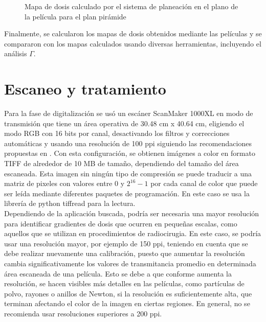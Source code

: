 \begin{figure}
	\centering
	
	\caption{Mapa de dosis calculado por el sistema de planeación en el plano de la película para el plan pirámide}
	\label{fig:TPSMama}
\end{figure}

Finalmente, se calcularon los mapas de dosis obtenidos mediante las películas y se compararon con los mapas calculados usando diversas herramientas, incluyendo el análisis $\Gamma$.

\section{Escaneo y tratamiento}
Para la fase de digitalización se usó un escáner ScanMaker 1000XL en modo de transmisión que tiene un área operativa de 30.48 cm x 40.64 cm, eligiendo el modo RGB con 16 bits por canal, desactivando los filtros y correcciones automáticas y usando una resolución de 100 ppi siguiendo las recomendaciones propuestas en \cite{Devic2016}. Con esta configuración, se obtienen imágenes a color en formato TIFF de alrededor de 10 MB de tamaño, dependiendo del tamaño del área escaneada. Esta imagen sin ningún tipo de compresión se puede traducir a una matriz de pixeles con valores entre $0$ y $2^{16}-1$ por cada canal de color que puede ser leída mediante diferentes paquetes de programación. En este caso se usa la librería de python tiffread para la lectura. \\

Dependiendo de la aplicación buscada, podría ser necesaria una mayor resolución para identificar gradientes de dosis que ocurren en pequeñas escalas, como aquellos que se utilizan en procedimientos de radiocirugia. En este caso, se podría usar una resolución mayor, por ejemplo de 150 ppi, teniendo en cuenta que se debe realizar nuevamente una calibración, puesto que aumentar la resolución cambia significativamente los valores de transmitancia promedio en determinada área escaneada de una película. Esto se debe a que conforme aumenta la resolución, se hacen visibles más detalles en las películas, como partículas de polvo, rayones o anillos de Newton, si la resolución es suficientemente alta, que terminan afectando el color de la imagen en ciertas regiones. En general, no se recomienda usar resoluciones superiores a 200 ppi.\cite{Devic2016}\\


